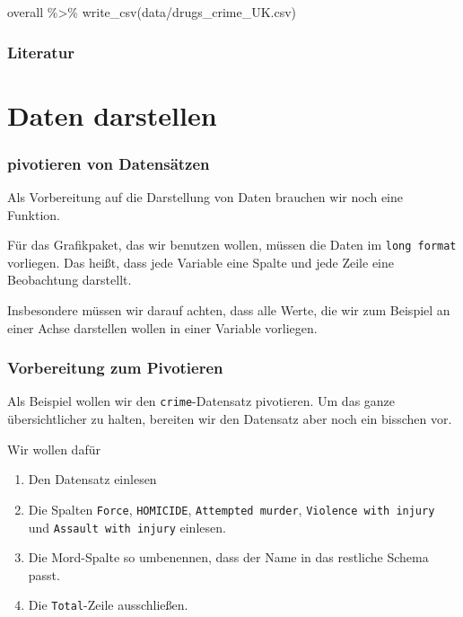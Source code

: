 \documentclass[
]{book}
\newenvironment{Shaded}{\begin{snugshade}}{\end{snugshade}}
\newcommand{\FunctionTok}[1]{\textcolor[rgb]{0.00,0.00,0.00}{#1}}
\newcommand{\NormalTok}[1]{#1}
\newcommand{\SpecialCharTok}[1]{\textcolor[rgb]{0.00,0.00,0.00}{#1}}
\newcommand{\StringTok}[1]{\textcolor[rgb]{0.31,0.60,0.02}{#1}}
\providecommand{\tightlist}{%
  \setlength{\itemsep}{0pt}\setlength{\parskip}{0pt}}
\begin{document}
\begin{Shaded}
\begin{Highlighting}[]
\NormalTok{overall }\SpecialCharTok{\%\textgreater{}\%} \FunctionTok{write\_csv}\NormalTok{(}\StringTok{\textquotesingle{}data/drugs\_crime\_UK.csv\textquotesingle{}}\NormalTok{)}
\end{Highlighting}
\end{Shaded}

\hypertarget{literatur-1}{%
\subsection{Literatur}\label{literatur-1}}

\hypertarget{daten-darstellen}{%
\chapter{Daten darstellen}\label{daten-darstellen}}

\hypertarget{pivotieren-von-datensuxe4tzen}{%
\subsection{pivotieren von Datensätzen}\label{pivotieren-von-datensuxe4tzen}}

Als Vorbereitung auf die Darstellung von Daten brauchen wir noch eine Funktion.

Für das Grafikpaket, das wir benutzen wollen, müssen die Daten im \texttt{long\ format} vorliegen. Das heißt, dass jede Variable eine Spalte und jede Zeile eine Beobachtung darstellt.

Insbesondere müssen wir darauf achten, dass alle Werte, die wir zum Beispiel an einer Achse darstellen wollen in einer Variable vorliegen.

\hypertarget{vorbereitung-zum-pivotieren}{%
\subsection{Vorbereitung zum Pivotieren}\label{vorbereitung-zum-pivotieren}}

Als Beispiel wollen wir den \texttt{\textquotesingle{}crime\textquotesingle{}}-Datensatz pivotieren. Um das ganze übersichtlicher zu halten, bereiten wir den Datensatz aber noch ein bisschen vor.

Wir wollen dafür

\begin{enumerate}
\def\labelenumi{\arabic{enumi}.}
\tightlist
\item
  Den Datensatz einlesen
\item
  Die Spalten \texttt{Force}, \texttt{HOMICIDE}, \texttt{Attempted\ murder}, \texttt{Violence\ with\ injury} und \texttt{Assault\ with\ injury} einlesen.
\item
  Die Mord-Spalte so umbenennen, dass der Name in das restliche Schema passt.
\item
  Die \texttt{Total}-Zeile ausschließen.
\end{enumerate}
\end{document}
